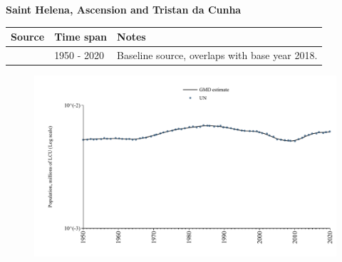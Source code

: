 \documentclass[12pt,a4paper,landscape]{article}
\begin{document}
\begin{adjustbox}{max totalsize={\paperwidth}{\paperheight},center}
\begin{minipage}[t][\textheight][t]{\textwidth}
\vspace*{0.5cm}
{}
\begin{center}
{\Large\bfseries Saint Helena, Ascension and Tristan da Cunha}
\end{center}
\vspace{0.5cm}
\begin{table}[H]
\centering
\small
\begin{tabular}{|l|l|l|}
\hline
\textbf{Source} & \textbf{Time span} & \textbf{Notes} \\
\hline
\rowcolor{white}\cite{UN}& 1950 - 2020 &Baseline source, overlaps with base year 2018.\\
\hline
\end{tabular}
\end{table}
\begin{figure}[H]
\centering
\includegraphics[width=\textwidth,height=0.6\textheight,keepaspectratio]{graphs/SHN_pop.pdf}
\end{figure}
\end{minipage}
\end{adjustbox}
\end{document}
